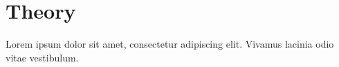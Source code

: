 \documentclass{article}
\begin{document}
\section{Theory}
Lorem ipsum dolor sit amet, consectetur adipiscing elit. Vivamus lacinia odio vitae vestibulum.

\lipsum[1]
\end{document}
